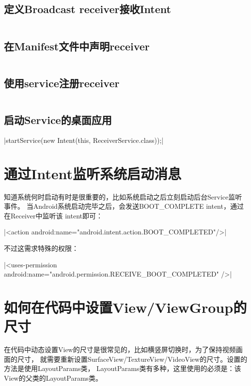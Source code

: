 ﻿\documentclass[a4paper,11pt]{article}
\begin{document}
  \subsection[定义Broadcast receiver接收Intent]{定义Broadcast receiver接收Intent}
  \inputminted[linenos,tabsize=4,bgcolor=srcbg,fontsize=\small]{java}{ScreenBroadcastReceiver.java}

  \subsection[在Manifest文件中声明receiver]{在Manifest文件中声明receiver}
  \inputminted[linenos,tabsize=4,bgcolor=srcbg]{xml}{AndroidManifest.xml}

  \subsection[使用service注册receiver]{使用service注册receiver}
  \inputminted[linenos,tabsize=4,bgcolor=srcbg]{java}{ReceiverService.java}

  \subsection[启动Service的桌面应用]{启动Service的桌面应用}
  |startService(new Intent(this, ReceiverService.class));|

  \section[通过Intent监听系统启动消息]{通过Intent监听系统启动消息}
  知道系统何时启动有时是很重要的，比如系统启动之后立刻启动后台Service监听事件。
  当Android系统启动完毕之后，会发送BOOT\_COMPLETE intent，通过在Receiver中监听该
  intent即可：\par
  |<action android:name="android.intent.action.BOOT_COMPLETED"/>|

  不过这需求特殊的权限：\par
  |<uses-permission android:name="android.permission.RECEIVE_BOOT_COMPLETED" />|


  \section[如何在代码中设置View/ViewGroup的尺寸]{如何在代码中设置View/ViewGroup的尺寸}
  在代码中动态设置View的尺寸是很常见的，比如横竖屏切换时，为了保持视频画面的尺寸，
  就需要重新设置SurfaceView/TextureView/VideoView的尺寸。设置的方法是使用LayoutParams类，
  LayoutParams类有多种，这里使用的必须是：该View的父类的LayoutParams类。
\end{document}
